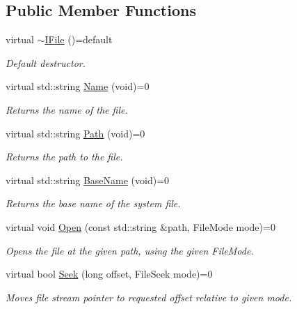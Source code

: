 \subsection*{Public Member Functions}
\begin{DoxyCompactItemize}
\item 
virtual \hyperlink{classHatchit_1_1Core_1_1IFile_a751bf55568c01c776beb115f76b7a929}{$\sim$\+I\+File} ()=default
\begin{DoxyCompactList}\small\item\em Default destructor. \end{DoxyCompactList}\item 
virtual std\+::string \hyperlink{classHatchit_1_1Core_1_1IFile_ac60ac0b57e7af8ca509723be55e4638b}{Name} (void)=0
\begin{DoxyCompactList}\small\item\em Returns the name of the file. \end{DoxyCompactList}\item 
virtual std\+::string \hyperlink{classHatchit_1_1Core_1_1IFile_a718f7b7b6ad27be36f1b224ac1254a66}{Path} (void)=0
\begin{DoxyCompactList}\small\item\em Returns the path to the file. \end{DoxyCompactList}\item 
virtual std\+::string \hyperlink{classHatchit_1_1Core_1_1IFile_a9c62bd232c9cce46ccf39d864a816e56}{Base\+Name} (void)=0
\begin{DoxyCompactList}\small\item\em Returns the base name of the system file. \end{DoxyCompactList}\item 
virtual void \hyperlink{classHatchit_1_1Core_1_1IFile_af5b39a1db2e3e03ebb2a641fed60ea63}{Open} (const std\+::string \&path, File\+Mode mode)=0
\begin{DoxyCompactList}\small\item\em Opens the file at the given path, using the given File\+Mode. \end{DoxyCompactList}\item 
virtual bool \hyperlink{classHatchit_1_1Core_1_1IFile_aaf302f7b42b30af0c1827814d805098b}{Seek} (long offset, File\+Seek mode)=0
\begin{DoxyCompactList}\small\item\em Moves file stream pointer to requested offset relative to given mode. \end{DoxyCompactList}\item 

\end{DoxyCompactItemize}
